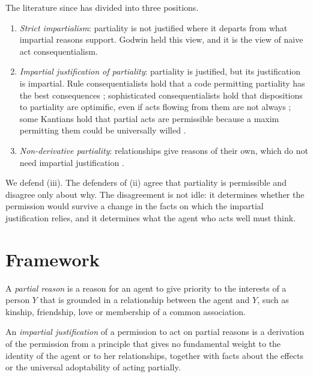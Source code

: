 \documentclass{situationist-preprint}
\begin{document}
The literature since has divided into three positions.
\begin{enumerate}[label=(\roman*)]
\item \emph{Strict impartialism}: partiality is not justified where it departs from what impartial reasons support. Godwin held this view, and it is the view of naive act consequentialism.
\item \emph{Impartial justification of partiality}: partiality is justified, but its justification is impartial. Rule consequentialists hold that a code permitting partiality has the best consequences \citep{Hooker2000}; sophisticated consequentialists hold that dispositions to partiality are optimific, even if acts flowing from them are not always \citep{Railton1984}; some Kantians hold that partial acts are permissible because a maxim permitting them could be universally willed \citep{Baron1991}.
\item \emph{Non-derivative partiality}: relationships give reasons of their own, which do not need impartial justification \citep{Williams1981,Scheffler1997,Kolodny2003,Keller2013}.
\end{enumerate}

We defend (iii). The defenders of (ii) agree that partiality is permissible and disagree only about why. The disagreement is not idle: it determines whether the permission would survive a change in the facts on which the impartial justification relies, and it determines what the agent who acts well must think.

\section{Framework}

\begin{definition}\label{d:partial}
A \emph{partial reason} is a reason for an agent to give priority to the interests of a person $Y$ that is grounded in a relationship between the agent and $Y$, such as kinship, friendship, love or membership of a common association.
\end{definition}

\begin{definition}\label{d:impartial}
An \emph{impartial justification} of a permission to act on partial reasons is a derivation of the permission from a principle that gives no fundamental weight to the identity of the agent or to her relationships, together with facts about the effects or the universal adoptability of acting partially.
\end{definition}
\end{document}
